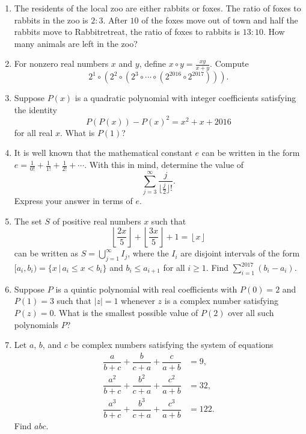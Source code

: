 \documentclass[10pt]{article}
\newcommand{\floor}[1]{\left\lfloor#1\right\rfloor}
\begin{document}
\begin{enumerate}

\item The residents of the local zoo are either rabbits or foxes. The ratio of foxes to rabbits in the zoo is $2:3$. After $10$ of the foxes move out of town and half the rabbits move to Rabbitretreat, the ratio of foxes to rabbits is $13:10$. How many animals are left in the zoo?

\item For nonzero real numbers $x$ and $y$, define $x\circ y = \tfrac{xy}{x+y}$.  Compute \[2^1\circ \left(2^2\circ \left(2^3\circ\cdots\circ\left(2^{2016}\circ 2^{2017}\right)\right)\right).\]

\item Suppose $P(x)$ is a quadratic polynomial with integer coefficients satisfying the identity \[P(P(x)) - P(x)^2 = x^2+x+2016\] for all real $x$.  What is $P(1)$?

\item It is well known that the mathematical constant $e$ can be written in the form $e = \tfrac{1}{0!}+\tfrac{1}{1!}+\tfrac{1}{2!}+\cdots$.  With this in mind, determine the value of
\[\sum_{j=3}^\infty\dfrac{j}{\lfloor\frac j2\rfloor!}.\]
Express your answer in terms of $e$.

\item The set $S$ of positive real numbers $x$ such that 
	\[
		\floor{\frac{2x}{5}} + \floor{\frac{3x}{5}} + 1 = \floor x
	\]
	can be written as $S = \bigcup_{j = 1}^{\infty} I_{j}$, where the $I_{i}$ are disjoint intervals of the form $[a_{i}, b_{i}) = \{x \, | \, a_i \leq x < b_i\}$ and $b_{i} \leq a_{i+1}$ for all $i \geq 1$. Find $\sum_{i=1}^{2017} (b_{i} - a_{i})$.
		
 
\item Suppose $P$ is a quintic polynomial with real coefficients with $P(0)=2$ and $P(1)=3$ such that $|z|=1$ whenever $z$ is a complex number satisfying $P(z) = 0$.  What is the smallest possible value of $P(2)$ over all such polynomials $P$?

\item Let $a$, $b$, and $c$ be complex numbers satisfying the system of equations \begin{align*}\dfrac{a}{b+c}+\dfrac{b}{c+a}+\dfrac{c}{a+b}&=9,\\\dfrac{a^2}{b+c}+\dfrac{b^2}{c+a}+\dfrac{c^2}{a+b}&=32,\\\dfrac{a^3}{b+c}+\dfrac{b^3}{c+a}+\dfrac{c^3}{a+b}&=122.\end{align*} Find $abc$.


\end{enumerate}
\end{document}
